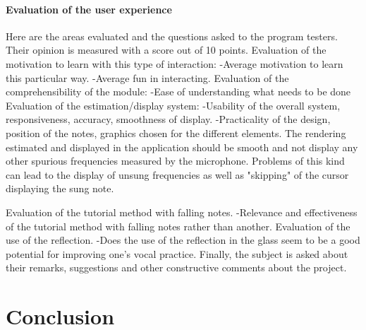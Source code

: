 \paragraph{Evaluation of the user experience}

Here are the areas evaluated and the questions asked to the program testers. Their opinion is measured with a score out of 10 points.
Evaluation of the motivation to learn with this type of interaction: -Average motivation to learn this particular way. -Average fun in interacting.
Evaluation of the comprehensibility of the module: -Ease of understanding what needs to be done Evaluation of the estimation/display system: -Usability of the overall system, responsiveness, accuracy, smoothness of display. -Practicality of the design, position of the notes, graphics chosen for the different elements. The rendering estimated and displayed in the application should be smooth and not display any other spurious frequencies measured by the microphone. Problems of this kind can lead to the display of unsung frequencies as well as "skipping" of the cursor displaying the sung note. 

Evaluation of the tutorial method with falling notes. -Relevance and effectiveness of the tutorial method with falling notes rather than another.
Evaluation of the use of the reflection. -Does the use of the reflection in the glass seem to be a good potential for improving one’s vocal practice. Finally, the subject is asked about their remarks, suggestions and other constructive comments about the project.

\section{Conclusion}
